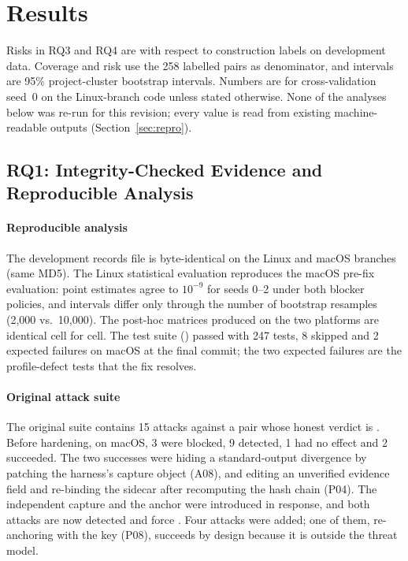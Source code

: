 \section{Results}\label{sec:results}

Risks in RQ3 and RQ4 are with respect to construction labels on development data. Coverage and risk use the 258 labelled pairs as denominator, and intervals are 95\% project-cluster bootstrap intervals. Numbers are for cross-validation seed~0 on the Linux-branch code unless stated otherwise. None of the analyses below was re-run for this revision; every value is read from existing machine-readable outputs (Section~\ref{sec:repro}).

\subsection{RQ1: Integrity-Checked Evidence and Reproducible Analysis}\label{sec:res-rq1}
\paragraph*{Reproducible analysis} The development records file is byte-identical on the Linux and macOS branches (same MD5). The Linux statistical evaluation reproduces the macOS pre-fix evaluation: point estimates agree to $10^{-9}$ for seeds 0--2 under both blocker policies, and intervals differ only through the number of bootstrap resamples (2{,}000 vs.\ 10{,}000). The post-hoc \ers{} matrices produced on the two platforms are identical cell for cell. The \sbg{} test suite () passed with 247 tests, 8 skipped and 2 expected failures on macOS at the final commit; the two expected failures are the profile-defect tests that the fix resolves.

\paragraph*{Original attack suite} The original suite contains 15 attacks against a pair whose honest verdict is \DIV{}. Before hardening, on macOS, 3 were blocked, 9 detected, 1 had no effect and 2 succeeded. The two successes were hiding a standard-output divergence by patching the harness's capture object (A08), and editing an unverified evidence field and re-binding the sidecar after recomputing the hash chain (P04). The independent capture and the anchor were introduced in response, and both attacks are now detected and force \INS{}. Four attacks were added; one of them, re-anchoring with the key (P08), succeeds by design because it is outside the threat model.

